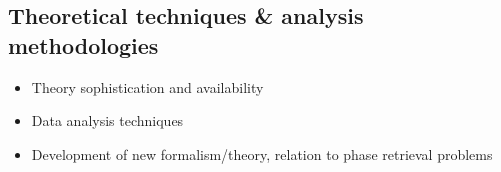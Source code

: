 \subsection{Theoretical techniques \& analysis methodologies}

\begin{itemize}
\item Theory sophistication and availability
\item Data analysis techniques
\item Development of new formalism/theory, relation to phase retrieval problems
\end{itemize}